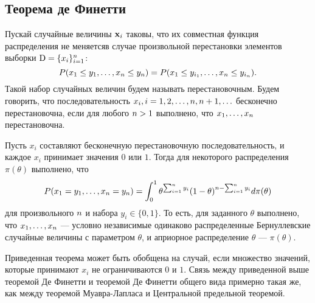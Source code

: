 \subsection{Теорема де Финетти}

Пускай случайные величины $\mathbf{x}_i$ таковы, что их совместная функция распределения не меняетсяв случае произвольной перестановки элементов выборки $\mathrm{D} = \{x_i\}_{i = 1}^{n}$:
\[
P(x_1 \leq y_1, \ldots, x_{n} \leq y_{n}) = P(x_1 \leq y_{i_1}, \ldots, x_{n} \leq y_{i_n}).
\]
Такой набор случайных величин будем называть перестановочным.
Будем говорить, что последовательность $x_i, i = 1, 2, \ldots, n, n + 1, \ldots$ бесконечно перестановочна, если для любого $n > 1$ выполнено, что $x_1, \ldots, x_{n}$ перестановочна.

\begin{Theorem}
Пусть $x_i$ составляют бесконечную перестановочную последовательность, и каждое $x_i$ принимает значения $0$ или $1$. 
Тогда для некоторого распределения $\pi(\theta)$ выполнено, что
\[
P(x_1 = y_1, \ldots, x_{n} = y_{n}) = \int_{0}^1 \theta^{\sum_{i = 1}^{n} y_i} (1 - \theta)^{n - \sum_{i = 1}^{n} y_i} d \pi(\theta)
\]
для произвольного $n$ и набора $y_i \in \{0, 1\}$.
То есть, для заданного $\theta$ выполнено, что $x_1, \ldots, x_{n}$ --- условно независимые одинаково распределенные Бернуллевские случайные величины  с параметром $\theta$, и априорное распределение $\theta$ --- $\pi(\theta)$.
\end{Theorem}

Приведенная теорема может быть обобщена на случай, если множество значений, которые принимают $x_i$ не ограничиваются $0$ и $1$.
Связь между приведенной выше теоремой Де Финетти и теоремой Де Финетти общего вида примерно такая же, как между теоремой Муавра-Лапласа и Центральной предельной теоремой.

